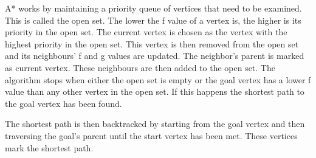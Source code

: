 A* works by maintaining a priority queue of vertices that need to be examined. This is called the open set. The lower the f value of a vertex is, the higher is its priority in the open set. The current vertex is chosen as the vertex with the highest priority in the open set. This vertex is then removed from the open set and its neighbours' f and g values are updated. The neighbor's parent is marked as current vertex. These neighbours are then added to the open set. The algorithm stops when either the open set is empty or the goal vertex has a lower f value than any other vertex in the open set. If this happens the shortest path to the goal vertex has been found.

The shortest path is then backtracked by starting from the goal vertex and then traversing the goal's parent until the start vertex has been met. These vertices mark the shortest path.

